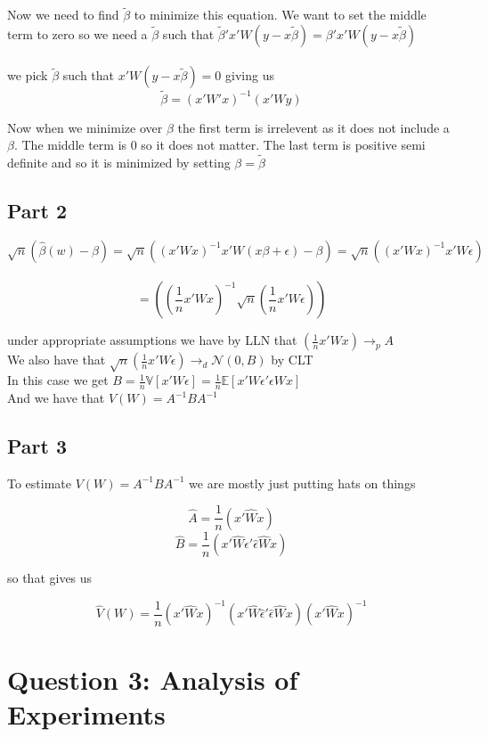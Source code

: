 \documentclass[11pt]{article}
\newcommand{\plim}{\rightarrow_{p}}
\begin{document}
Now we need to find $\tilde{\beta}$ to minimize this equation. We want to set the middle term to zero so we need a $\tilde{\beta}$ such that $\tilde{\beta}'x'W(y-x\tilde{\beta}) = \beta'x'W(y-x\tilde{\beta})$
\\ \\ 
we pick $\tilde{\beta}$ such that $x'W(y-x\tilde{\beta}) = 0$ giving us $$\tilde{\beta}=(x'W'x)^{-1}(x'Wy)$$

Now when we minimize over $\beta$ the first term is irrelevent as it does not include a $\beta$. The middle term is 0 so it does not matter. The last term is positive semi definite and so it is minimized by setting $\beta = \tilde{\beta}$

\subsection{Part 2}

$$ \sqrt{n} (\hat{\beta}(w)- \beta) = \sqrt{n}((x'Wx)^{-1}x'W(x\beta+\epsilon)-\beta)  
= \sqrt{n}((x'Wx)^{-1}x'W \epsilon)$$ \\
$$ = ((\frac{1}{n}x'Wx)^{-1} \sqrt{n} (\frac{1}{n} x'W\epsilon))$$

under appropriate assumptions we have by LLN that $ (\frac{1}{n}x'Wx) \plim A $ \\
We also have that $  \sqrt{n} (\frac{1}{n} x'W\epsilon) \rightarrow_{d} \mathcal{N}(0,B)$ by CLT  \\
In this case we get $ B = \frac{1}{n}  \mathbb{V}[x'W\epsilon] = \frac{1}{n} \mathbb{E}[x'W\epsilon'\epsilon Wx] $\\
And we have that $ V(W) = A^{-1}BA^{-1} $
 
\subsection{Part 3}

To estimate $V(W) = A^{-1}BA^{-1} $ we are mostly just putting hats on things 

$$\hat{A} = \frac{1}{n}(x'\hat{W}x)$$ 
$$\hat{B} = \frac{1}{n}(x'\hat{W} \hat{\epsilon}' \hat{\epsilon} \hat{W}x)$$

 so that gives us 
 
 $$ \hat{V}(W) = \frac{1}{n} (x'\hat{W}x)^{-1} (x'\hat{W} \hat{\epsilon}' \hat{\epsilon} \hat{W}x) (x'\hat{W}x)^{-1} $$
 
 \section{Question 3: Analysis of Experiments}
 
\end{document}
